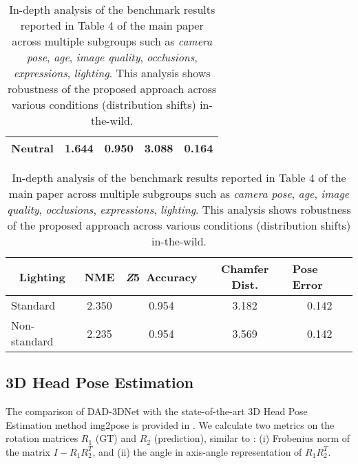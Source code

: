 \documentclass[10pt,twocolumn,letterpaper]{article}
\begin{document}
\begin{table}
\begin{tabular}{l|cccc}
Neutral                                   & 1.644                 & 0.950                                                    & 3.088                           & 0.164                                             \\
\bottomrule
\end{tabular}
\footnotesize
\begin{tabular}{l|cccc} 
\toprule
\multicolumn{1}{c}{\textbf{Lighting}} & \textbf{\textbf{NME}} & \textbf{\textbf{\textit{Z}5}}~\textbf{\textbf{Accuracy}} & \textbf{\textbf{Chamfer Dist.}} & \multicolumn{1}{l}{\textbf{\textbf{Pose Error}}}  \\ 
\toprule
Standard                                        & 2.350                 & 0.954                                                    & 3.182                           & 0.142                                             \\
Non-standard                                       & 2.235                 & 0.954                                                    & 3.569                           & 0.142                                             \\
\bottomrule
\end{tabular}
\caption{In-depth analysis of the benchmark results reported in Table 4 of the main paper across multiple subgroups such as \emph{camera pose}, \emph{age}, \emph{image quality}, \emph{occlusions}, \emph{expressions}, \emph{lighting}. This analysis shows robustness of the proposed approach across various conditions (distribution shifts) in-the-wild.}
\label{T:allmetrics}
\end{table} 

\subsection{3D Head Pose Estimation}

The comparison of DAD-3DNet with the state-of-the-art 3D Head Pose Estimation method img2pose \cite{img2pose} is provided in . We calculate two metrics on the rotation matrices $R_1$ (GT) and $R_2$ (prediction), similar to : (i) Frobenius norm of the matrix $I - R_1 R_2^{T}$, and (ii) the angle in axis-angle representation of $R_1 R_2^T$.
\end{document}
